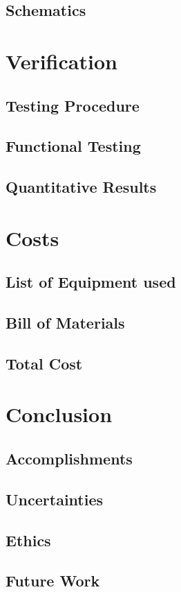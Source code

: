\documentclass[12pt]{article}
\begin{document}
\subsection{Schematics}

\section{Verification}
\subsection{Testing Procedure}
\subsection{Functional Testing}
\subsection{Quantitative Results}

\section{Costs}
\subsection{List of Equipment used}
\subsection{Bill of Materials}
\subsection{Total Cost}

\section{Conclusion}
\subsection{Accomplishments}
\subsection{Uncertainties}
\subsection{Ethics}
\subsection{Future Work}
\end{document}
